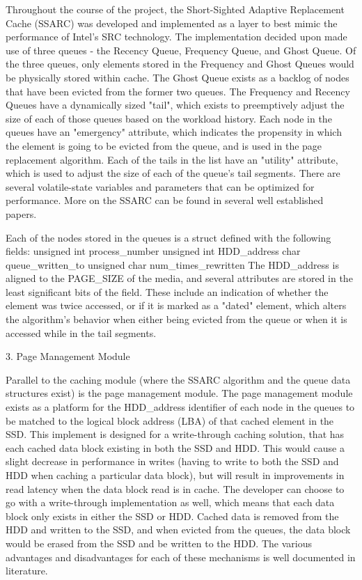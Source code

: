 \documentclass[11pt]{article}
\begin{document}
Throughout the course of the project, the Short-Sighted Adaptive Replacement Cache (SSARC) was developed and implemented as a layer to best mimic the performance of Intel's SRC technology. The implementation decided upon made use of three queues - the Recency Queue, Frequency Queue, and Ghost Queue. Of the three queues, only elements stored in the Frequency and Ghost Queues would be physically stored within cache. The Ghost Queue exists as a backlog of nodes that have been evicted from the former two queues. The Frequency and Recency Queues have a dynamically sized "tail", which exists to preemptively adjust the size of each of those queues based on the workload history. Each node in the queues have an "emergency" attribute, which indicates the propensity in which the element is going to be evicted from the queue, and is used in the page replacement algorithm. Each of the tails in the list have an "utility" attribute, which is used to adjust the size of each of the queue's tail segments. There are several volatile-state variables and parameters that can be optimized for performance.  More on the SSARC can be found in several well established papers.

Each of the nodes stored in the queues is a struct defined with the following fields:
	unsigned int process_number
	unsigned int HDD_address
	char queue_written_to
	unsigned char num_times_rewritten
The HDD_address is aligned to the PAGE_SIZE of the media, and several attributes are stored in the least significant bits of the field. These include an indication of whether the element was twice accessed, or if it is marked as a "dated" element, which alters the algorithm's behavior when either being evicted from the queue or when it is accessed while in the tail segments.

3. Page Management Module

Parallel to the caching module (where the SSARC algorithm and the queue data structures exist) is the page management module. The page management module exists as a platform for the HDD_address identifier of each node in the queues to be matched to the logical block address (LBA) of that cached element in the SSD. This implement is designed for a write-through caching solution, that has each cached data block existing in both the SSD and HDD. This would cause a slight decrease in performance in writes (having to write to both the SSD and HDD when caching a particular data block), but will result in improvements in read latency when the data block read is in cache. The developer can choose to go with a write-through implementation as well, which means that each data block only exists in either the SSD or HDD. Cached data is removed from the HDD and written to the SSD, and when evicted from the queues, the data block would be erased from the SSD and be written to the HDD. The various advantages and disadvantages for each of these mechanisms is well documented in literature.
\end{document}
